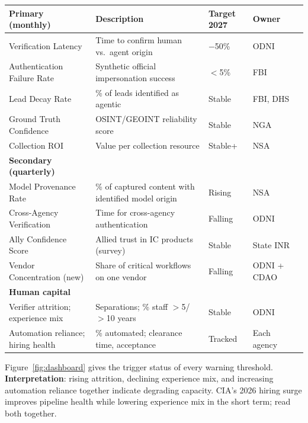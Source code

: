 \documentclass[11pt,letterpaper]{article}
\begin{document}
\begin{center}
\scriptsize
\begin{tabularx}{\linewidth}{ZY{1.06}Y{1.69}Y{0.69}Y{0.56}}
\toprule
\textbf{Primary (monthly)} & \textbf{Description} & \textbf{Target 2027} & \textbf{Owner} \\
\midrule
Verification Latency & Time to confirm human vs.\ agent origin & $-$50\% & ODNI \\
Authentication Failure Rate & Synthetic official impersonation success & $<$5\% & FBI \\
Lead Decay Rate & \% of leads identified as agentic & Stable & FBI, DHS \\
Ground Truth Confidence & OSINT/GEOINT reliability score & Stable & NGA \\
Collection ROI & Value per collection resource & Stable+ & NSA \\
\midrule
\textbf{Secondary (quarterly)} & & & \\
\midrule
Model Provenance Rate & \% of captured content with identified model origin & Rising & NSA \\
Cross-Agency Verification & Time for cross-agency authentication & Falling & ODNI \\
Ally Confidence Score & Allied trust in IC products (survey) & Stable & State INR \\
Vendor Concentration (new) & Share of critical workflows on one vendor & Falling & ODNI + CDAO \\
\midrule
\textbf{Human capital} & & & \\
\midrule
Verifier attrition; experience mix & Separations; \% staff $>$5/$>$10 years & Stable & ODNI \\
Automation reliance; hiring health & \% automated; clearance time, acceptance & Tracked & Each agency \\
\bottomrule
\end{tabularx}
\end{center}

Figure~\ref{fig:dashboard} gives the trigger status of every warning threshold. \textbf{Interpretation}: rising attrition, declining experience mix, and increasing automation reliance together indicate degrading capacity. CIA's 2026 hiring surge improves pipeline health while lowering experience mix in the short term; read both together.
\end{document}
